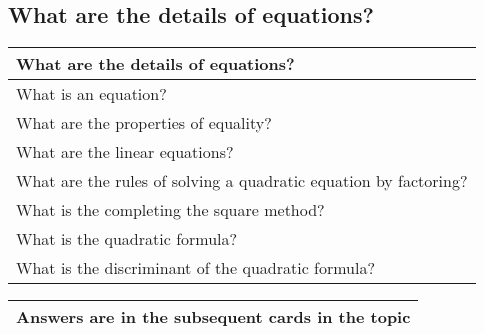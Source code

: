 \subsection{What are the details of equations?}
\begin{small}
    \begin{tabularx}{1\textwidth}{
            p{}
        }
        \toprule
        \textbf{What are the details of equations?}
        \\
        \midrule

        What is an equation?
        \\
        \midrule

        What are the properties of equality?
        \\
        \midrule

        What are the linear equations?
        \\
        \midrule

        What are the rules of solving a quadratic equation by factoring?
        \\
        \midrule

        What is the completing the square method?
        \\
        \midrule

        What is the quadratic formula?
        \\
        \midrule

        What is the discriminant of the quadratic formula?
        \\
        \bottomrule
    \end{tabularx}
\end{small}
\begin{small}
    \begin{tabularx}{1\textwidth}{
            p{}
        }
        \toprule
        Answers are in the subsequent cards in the topic
        \\
        \bottomrule

    \end{tabularx}
\end{small}
